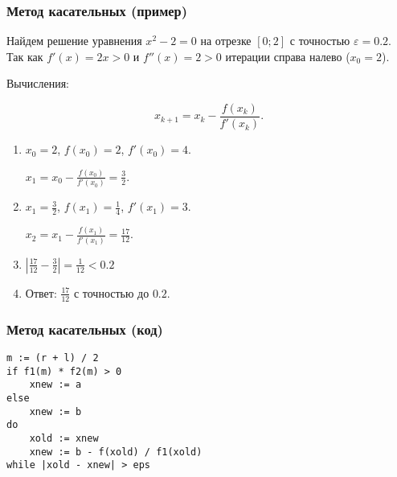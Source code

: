 \documentclass[10pt]{beamer}
\begin{document}
\begin{frame}[fragile]
\frametitle{Метод касательных (пример)}

Найдем решение уравнения $x^2 - 2 = 0$ на отрезке $[0; 2]$ с точностью $\varepsilon = 0.2$. Так как $f'(x) = 2 x > 0$ и $f''(x) = 2 > 0$ итерации справа налево ($x_0 = 2$).

\begin{minipage}{0.4\linewidth}
\end{minipage}
\begin{minipage}{0.5\linewidth}
Вычисления:

$$x_{k+1} = x_k - \frac{f(x_k)}{f'(x_k)}.$$

\begin{enumerate}
\item $x_0 = 2$, $f(x_0) = 2$, $f'(x_0) = 4$.

$x_{1} = x_0 - \frac{f(x_0)}{f'(x_0)} = \frac{3}{2}$.

\item $x_1 = \frac{3}{2}$, $f(x_1) = \frac{1}{4}$, $f'(x_1) = 3$.

$x_{2} = x_1 - \frac{f(x_1)}{f'(x_1)} = \frac{17}{12} $.

\item $\left| \frac{17}{12} - \frac{3}{2} \right| = \frac{1}{12} < 0.2$

\item Ответ: $\frac{17}{12}$ с точностью до $0.2$.
\end{enumerate}
\end{minipage}


\end{frame}





\begin{frame}[fragile]
\frametitle{Метод касательных (код)}
\begin{lstlisting}
m := (r + l) / 2
if f1(m) * f2(m) > 0
    xnew := a
else
    xnew := b
do
    xold := xnew
    xnew := b - f(xold) / f1(xold)
while |xold - xnew| > eps
\end{lstlisting}


\end{frame}
\end{document}
